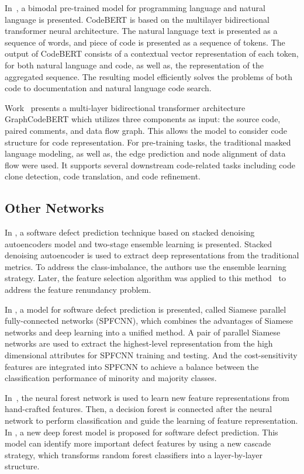 \documentclass{article}
\begin{document}
In~\cite{FengEtAl2020}, a bimodal pre-trained model for programming language and natural language is presented.
CodeBERT is based on the multilayer bidirectional transformer neural architecture.
The natural language text is presented as a sequence of words, and piece of code is presented as a sequence of tokens.
The output of CodeBERT consists of a contextual vector representation of each token, for both natural language and code,
as well as, the representation of the aggregated sequence.
The resulting model efficiently solves the problems of both code to documentation and natural language code search. 

Work~\cite{guo2021graphcodebert} presents a multi-layer bidirectional transformer architecture GraphCodeBERT which utilizes three components as input: the source code, paired comments, and data flow graph. This allows the model to consider code structure for code representation. For pre-training tasks, the traditional masked language modeling, as well as, the edge prediction and node alignment of data flow were used.
It supports several downstream code-related tasks including code clone detection, code translation, and code refinement.


\subsection{Other Networks}

In \cite{TongLiuWang2018}, a software defect prediction technique based on stacked denoising autoencoders model and two-stage ensemble learning is presented. Stacked denoising autoencoder is used to extract deep representations from the traditional metrics. To address the class-imbalance, the authors use the ensemble learning strategy. Later, the feature selection algorithm was applied to this method~\cite{TranHanhBinh2019} to address the feature renundancy problem.

In \cite{ZhaoEtAl2019}, a model for software defect prediction is presented, called Siamese parallel fully-connected networks (SPFCNN), which combines the advantages of Siamese networks and deep learning into a unified method. A pair of parallel Siamese networks are used to extract  the highest-level representation from the high dimensional attributes for SPFCNN training and testing. And the cost-sensitivity features are integrated into SPFCNN to achieve a balance between the classification performance of minority and majority classes.

In~\cite{QiuEtAl2019}, the neural forest network is used to learn new feature representations from hand-crafted features. Then, a decision forest is connected after the neural network to perform classification and guide the learning of feature representation. 
In \cite{ZhouEtAl2019}, a new deep forest model is proposed for software defect prediction. This model can identify more important defect features by using a new cascade strategy, which transforms random forest classifiers into a layer-by-layer structure.
\end{document}
